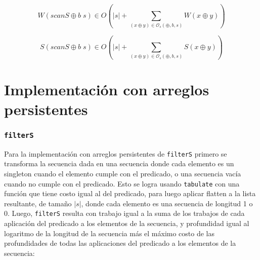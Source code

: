 \documentclass[a4paper,10pt]{article}
\begin{document}
\begin{equation*}
    W \left( scanS \oplus b \; s \right) \in
    O \left( \vert s \vert + \sum_{(x \oplus y) \in \mathcal{O}_s(\oplus,b,s)} W \left( x \oplus y \right) \right)
\end{equation*}

\begin{equation*}
    S \left( scanS \oplus b \; s \right) \in
    O \left( \vert s \vert + \sum_{(x \oplus y) \in \mathcal{O}_s(\oplus,b,s)} S \left( x \oplus y \right) \right)
\end{equation*}

\newpage{}
































\part*{Implementación con arreglos persistentes}

\section*{\texttt{filterS}}

Para la implementación con arreglos persistentes de \texttt{filterS} primero se
transforma la secuencia dada en una secuencia donde cada elemento es un singleton
cuando el elemento cumple con el predicado, o una secuencia vacía cuando no cumple
con el predicado. Esto se logra usando \texttt{tabulate} con una función que tiene
costo igual al del predicado, para luego aplicar flatten a la lista resultante,
de tamaño $\vert s \vert$, donde cada elemento es una secuencia de longitud 1 o 0.
Luego, \texttt{filterS} resulta con trabajo igual a la suma de los trabajos de
cada aplicación del predicado a los elementos de la secuencia, y profundidad igual
al logaritmo de la longitud de la secuencia más el máximo costo de las profundidades
de todas las aplicaciones del predicado a los elementos de la secuencia:
\end{document}

